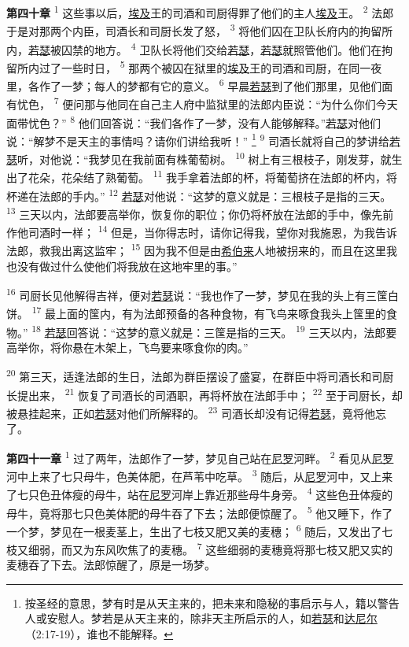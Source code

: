 \textbf{第四十章\quad}
\textsuperscript{1}
这些事以后，\uline{埃及}王的司酒和司厨得罪了他们的主人\uline{埃及}王。
\textsuperscript{2}
法郎于是对那两个内臣，司酒长和司厨长发了怒，
\textsuperscript{3}
将他们囚在卫队长府内的拘留所内，\uline{若瑟}被囚禁的地方。
\textsuperscript{4}
卫队长将他们交给\uline{若瑟}，\uline{若瑟}就照管他们。他们在拘留所内过了一些时日，
\textsuperscript{5}
那两个被囚在狱里的\uline{埃及}王的司酒和司厨，在同一夜里，各作了一梦；每人的梦都有它的意义。
\textsuperscript{6}
早晨\uline{若瑟}到了他们那里，见他们面有忧色，
\textsuperscript{7}
便问那与他同在自己主人府中监狱里的法郎内臣说：“为什么你们今天面带忧色？”
\textsuperscript{8}
他们回答说：“我们各作了一梦，没有人能够解释。”\uline{若瑟}对他们说：“解梦不是天主的事情吗？请你们讲给我听！”
\footnote{按圣经的意思，梦有时是从天主来的，把未来和隐秘的事启示与人，籍以警告人或安慰人。梦若是从天主来的，除非天主所启示的人，如\uline{若瑟}和\uline{达尼尔}（2:17-19），谁也不能解释。}
\textsuperscript{9}
司酒长就将自己的梦讲给\uline{若瑟}听，对他说：“我梦见在我前面有株葡萄树。
\textsuperscript{10}
树上有三根枝子，刚发芽，就生出了花朵，花朵结了熟葡萄。
\textsuperscript{11}
我手拿着法郎的杯，将葡萄挤在法郎的杯内，将杯递在法郎的手内。”
\textsuperscript{12}
\uline{若瑟}对他说：“这梦的意义就是：三根枝子是指的三天。
\textsuperscript{13}
三天以内，法郎要高举你，恢复你的职位；你仍将杯放在法郎的手中，像先前作他司酒时一样；
\textsuperscript{14}
但是，当你得志时，请你记得我，望你对我施恩，为我告诉法郎，救我出离这监牢；
\textsuperscript{15}
因为我不但是由\uline{希伯来}人地被拐来的，而且在这里我也没有做过什么使他们将我放在这地牢里的事。”

\textsuperscript{16}
司厨长见他解得吉祥，便对\uline{若瑟}说：“我也作了一梦，梦见在我的头上有三筺白饼。
\textsuperscript{17}
最上面的筺内，有为法郎预备的各种食物，有飞鸟来啄食我头上筺里的食物。”
\textsuperscript{18}
\uline{若瑟}回答说：“这梦的意义就是：三筺是指的三天。
\textsuperscript{19}
三天以内，法郎要高举你，将你悬在木架上，飞鸟要来啄食你的肉。”

\textsuperscript{20}
第三天，适逢法郎的生日，法郎为群臣摆设了盛宴，在群臣中将司酒长和司厨长提出来，
\textsuperscript{21}
恢复了司酒长的司酒职，再将杯放在法郎手中；
\textsuperscript{22}
至于司厨长，却被悬挂起来，正如\uline{若瑟}对他们所解释的。
\textsuperscript{23}
司酒长却没有记得\uline{若瑟}，竟将他忘了。

\textbf{第四十一章\quad}
\textsuperscript{1}
过了两年，法郎作了一梦，梦见自己站在\uline{尼罗}河畔。
\textsuperscript{2}
看见从\uline{尼罗}河中上来了七只母牛，色美体肥，在芦苇中吃草。
\textsuperscript{3}
随后，从\uline{尼罗}河中，又上来了七只色丑体瘦的母牛，站在\uline{尼罗}河岸上靠近那些母牛身旁。
\textsuperscript{4}
这些色丑体瘦的母牛，竟将那七只色美体肥的母牛吞了下去；法郎便惊醒了。
\textsuperscript{5}
他又睡下，作了一个梦，梦见在一根麦茎上，生出了七枝又肥又美的麦穗；
\textsuperscript{6}
随后，又发出了七枝又细弱，而又为东风吹焦了的麦穗。
\textsuperscript{7}
这些细弱的麦穗竟将那七枝又肥又实的麦穗吞了下去。法郎惊醒了，原是一场梦。


